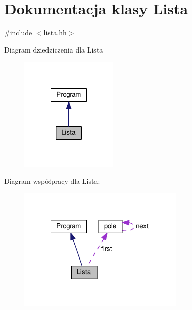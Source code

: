 \hypertarget{class_lista}{\section{Dokumentacja klasy Lista}
\label{class_lista}
}


{\ttfamily \#include $<$lista.\-hh$>$}



Diagram dziedziczenia dla Lista\nopagebreak
\begin{figure}[H]
\begin{center}
\leavevmode
\includegraphics[width=132pt]{class_lista__inherit__graph}
\end{center}
\end{figure}


Diagram współpracy dla Lista\-:\nopagebreak
\begin{figure}[H]
\begin{center}
\leavevmode
\includegraphics[width=225pt]{class_lista__coll__graph}
\end{center}
\end{figure}
